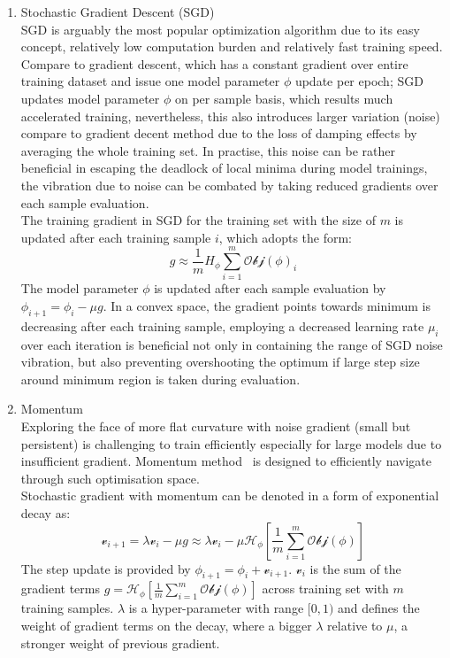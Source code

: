 \begin{enumerate}
    \item Stochastic Gradient Descent (SGD)\\
SGD is arguably the most popular optimization algorithm due to its easy concept, relatively low computation burden and relatively fast training speed. Compare to gradient descent, which has a constant gradient over entire training dataset and issue one  model parameter $\phi$ update per epoch; SGD updates model parameter $\phi$ on per sample basis, which results much accelerated training, nevertheless, this also introduces larger variation (noise) compare to gradient decent method due to the loss of damping effects by averaging the whole training set. In practise, this noise can be rather beneficial in escaping the deadlock of local minima during model trainings, the vibration due to noise can be combated by taking reduced gradients over each sample evaluation. \\
The training gradient in SGD for the training set with the size of $m$ is updated after each training sample $i$, which adopts the form: 
\begin{equation}
    g \approx \frac{1}{m}H_{\phi}\sum_{i=1}^m\mathcal{Obj}(\phi)_i
\end{equation}
The model parameter $\phi$ is updated after each sample evaluation by $\phi_{i+1} = \phi_i - \mu g$. In a convex space, the gradient points towards minimum is decreasing after each training sample, employing a decreased learning rate $\mu_i$ over each iteration is beneficial not only in containing the range of SGD noise vibration, but also preventing overshooting the optimum if large step size around minimum region is taken during evaluation. 
    \item Momentum \\
Exploring the face of more flat curvature with noise gradient (small but persistent) is challenging to train efficiently especially for large models due to insufficient gradient. Momentum method~\cite{POLYAK19641} is designed to efficiently navigate through such optimisation space. \\
Stochastic gradient with momentum can be denoted in a form of exponential decay as: 
\begin{equation}
    \mathcal{v}_{i+1} = \lambda \mathcal{v}_i - \mu g \approx \lambda \mathcal{v}_i - \mu \mathcal{H}_{\phi} [\frac{1}{m} \sum_{i=1}^m
    \mathcal{Obj}(\phi)]
\end{equation}
The step update is provided by $\phi_{i+1} = \phi_i + \mathcal{v}_{i+1}$. $\mathcal{v}_i$ is the sum of the gradient terms $g = \mathcal{H}_{\phi} [\frac{1}{m} \sum_{i=1}^m \mathcal{Obj}(\phi)]$ across training set with $m$ training samples. $\lambda$ is a hyper-parameter with range $[0,1)$ and defines the weight of  gradient terms on the decay, where a bigger $\lambda$ relative to $\mu$, a stronger weight of previous gradient. 
    

\end{enumerate}
